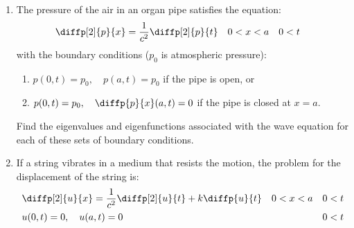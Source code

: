 \documentclass[12pt]{article}
\begin{document}
\begin{enumerate}
          
    \item The pressure of the air in an organ pipe satisfies the equation:
          \begin{align*}
               & \diffp[2]{p}{x} = \frac{1}{c^{2}} \diffp[2]{p}{t} &  & 0<x<a &  & 0<t
          \end{align*}
          with the boundary conditions ($p_{0}$ is atmospheric pressure):
          \begin{enumerate}
              \item $p(0,t) = p_{0}, \quad p(a,t)=p_{0}$ if the pipe is open, or
              \item $p(0,t) = p_{0}, \quad \diffp{p}{x}(a,t)=0$ if the pipe is closed at $x=a$.
          \end{enumerate}
          Find the eigenvalues and eigenfunctions associated with the wave equation for each of these sets of boundary conditions.
          
    \item If a string vibrates in a medium that resists the motion, the problem for the displacement of the string is:
          \begin{align*}
               & \diffp[2]{u}{x} = \frac{1}{c^{2}}\diffp[2]{u}{t} + k\diffp{u}{t} &  & 0<x<a &  & 0<t \\
               & u(0,t)=0, \quad u(a,t)=0                                         &  &       &  & 0<t
          \end{align*}
          
\end{enumerate}
\end{document}
